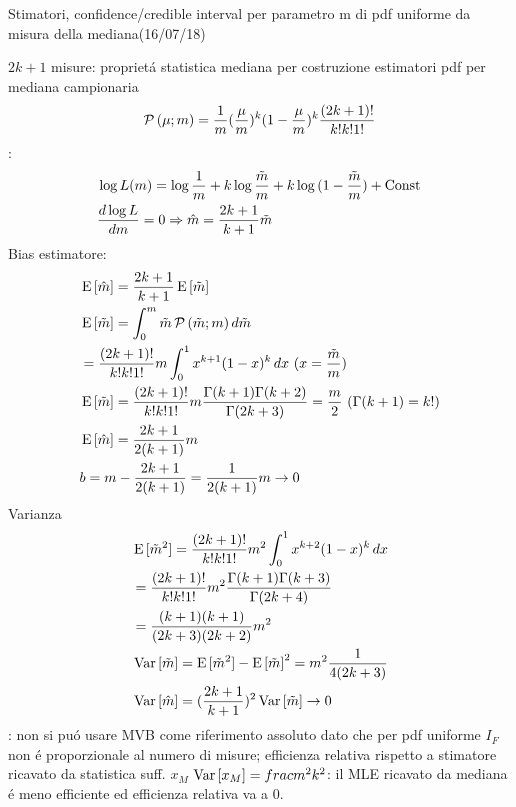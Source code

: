 \begin{wordonframe}{Stimatori, confidence/credible interval per parametro m di pdf uniforme da misura della mediana(16/07/18)}
	\begin{block}{$2k+1$ misure: propriet\'a statistica mediana per costruzione estimatori}
		pdf per mediana campionaria
		\begin{equation*}
		\prob{(\mu;m)}=\frac{1}{m}(\frac{\mu}{m})^k(1-\frac{\mu}{m})^k\frac{(2k+1)!}{k!k!1!}
		\end{equation*}
		:
		\begin{align*}
		&\log{L(m)}=\log{\frac{1}{m}}+k\log{\frac{\tilde{m}}{m}}+k\log{(1-\frac{\tilde{m}}{m})}+\const{}\\
		&\TDy{m}{\log{L}}=0 \Rightarrow \hat{m}=\frac{2k+1}{k+1}\tilde{m}
		\end{align*}
		Bias estimatore:
		\begin{align*}
		&\E{[\hat{m}]}=\frac{2k+1}{k+1}\E{[\tilde{m}]}\\
		&\E{[\tilde{m}]}=\int_0^m\tilde{m}\prob{(\tilde{m};m)}\,d\tilde{m}\\
		&=\frac{(2k+1)!}{k!k!1!}m\int_0^1x^{k+1}(1-x)^k\,dx\ (x=\frac{\tilde{m}}{m})\\
		&\E{[\tilde{m}]}=\frac{(2k+1)!}{k!k!1!}m\frac{\Gamma(k+1)\Gamma(k+2)}{\Gamma(2k+3)}=\frac{m}{2}\ (\Gamma(k+1)=k!)\\
		&\E{[\hat{m}]}=\frac{2k+1}{2(k+1)}m\\
		&b=m-\frac{2k+1}{2(k+1)}=\frac{1}{2(k+1)}m\to0
		\end{align*}
		Varianza
		\begin{align*}
		&\E{[\tilde{m}^2]}=\frac{(2k+1)!}{k!k!1!}m^2\int_0^1x^{k+2}(1-x)^k\,dx\\
		&=\frac{(2k+1)!}{k!k!1!}m^2\frac{\Gamma(k+1)\Gamma(k+3)}{\Gamma(2k+4)}\\
		&=\frac{(k+1)(k+1)}{(2k+3)(2k+2)}m^2\\
		&\var{[\tilde{m}]}=\E{[\tilde{m}^2]}-\E{[\tilde{m}]}^2=m^2\frac{1}{4(2k+3)}\\
		&\var{[\hat{m}]}=(\frac{2k+1}{k+1})^2\var{[\tilde{m}]}\to0
		\end{align*}
		: non si pu\'o usare MVB come riferimento assoluto dato che per pdf uniforme $I_F$ non \'e proporzionale al numero di misure; efficienza relativa rispetto a stimatore ricavato da statistica suff. $x_M$ $\var{[x_M]}=frac{m^2}{k^2}$: il MLE ricavato da mediana \'e meno efficiente ed efficienza relativa va a 0.
	\end{block}
\end{wordonframe}

